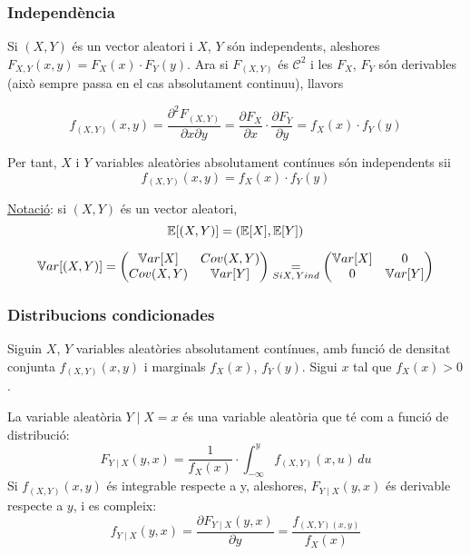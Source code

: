 \subsubsection{Independència}

Si $(X,Y)$ és un vector aleatori i $X$, $Y$ són independents, aleshores $F_{X,Y}(x,y) = F_{X}(x)\cdot F_{Y}(y)$. 
Ara si $F_{(X,Y)}$ és $\mathcal{C}^{2}$ i les $F_{X}$, $F_{Y}$ són derivables (això sempre passa en el cas absolutament continuu), llavors

\[
  f_{(X,Y)}(x,y) = \frac{\partial^{2}F_{(X,Y)}}{\partial x \partial y} = \frac{\partial F_{X}}{\partial x}\cdot \frac{\partial F_{Y}}{\partial y} = f_{X}(x) \cdot f_{Y}(y)
\]

Per tant, $X$ i $Y$ variables aleatòries absolutament contínues són independents sii
\[
  f_{(X,Y)}(x,y) = f_{X}(x)\cdot f_{Y}(y)
\]

\underline{Notació}: si $(X,Y)$ és un vector aleatori, 
\[
  \mathbb{E}[(X,Y)] = (\mathbb{E}[X], \mathbb{E}[Y])
\]

\[
  \mathbb{V} ar[(X,Y)] = 
  \begin{pmatrix}
    \mathbb{V} ar[X]  &  Cov(X,Y) \\
    Cov(X,Y)  &  \mathbb{V} ar[Y]
  \end{pmatrix}
  \underset{Si X,\, Y ind}{=}
  \begin{pmatrix}
    \mathbb{V} ar[X]  &  0 \\
    0         &  \mathbb{V} ar[Y]
  \end{pmatrix}
\]

\subsubsection{Distribucions condicionades}

Siguin $X$, $Y$ variables aleatòries absolutament contínues, amb funció de densitat conjunta $f_{(X,Y)}(x,y)$ 
i marginals $f_{X}(x)$, $f_{Y}(y)$. Sigui $x$ tal que $f_{X}(x) > 0$.

\begin{defi}
  La variable aleatòria $Y \mid X = x$ és una variable aleatòria que té com a funció de distribució:
  \[
    F_{Y\mid X}(y,x) = \frac{1}{f_{X}(x)} \cdot \int_{-\infty}^{y}f_{(X,Y)}(x,u) \, du
  \]
  Si $f_{(X,Y)}(x,y)$ és integrable respecte a y, aleshores, $F_{Y \mid X}(y,x)$ és derivable respecte a $y$, 
  i es compleix:
  \[
    f_{Y\mid X}(y,x) = \frac{\partial F_{Y\mid X}(y,x)}{\partial y} = \frac{f_{(X,Y)(x,y)}}{f_{X}(x)}
  \]
\end{defi}

